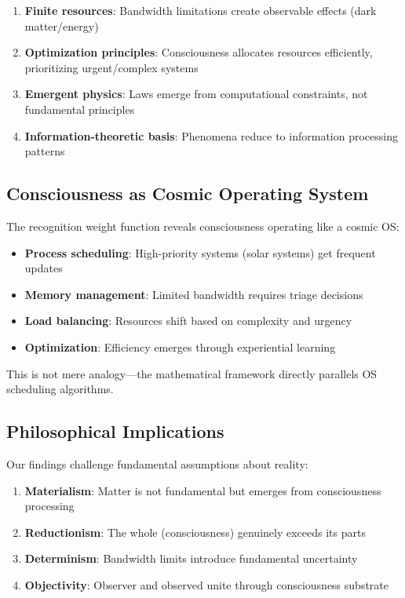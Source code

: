 \documentclass[twocolumn,prd,amsmath,amssymb,aps,superscriptaddress,nofootinbib]{revtex4-2}
\begin{document}
\begin{enumerate}
\item \textbf{Finite resources}: Bandwidth limitations create observable effects (dark matter/energy)
\item \textbf{Optimization principles}: Consciousness allocates resources efficiently, prioritizing urgent/complex systems
\item \textbf{Emergent physics}: Laws emerge from computational constraints, not fundamental principles
\item \textbf{Information-theoretic basis}: Phenomena reduce to information processing patterns
\end{enumerate}

\subsection{Consciousness as Cosmic Operating System}

The recognition weight function reveals consciousness operating like a cosmic OS:

\begin{itemize}
\item \textbf{Process scheduling}: High-priority systems (solar systems) get frequent updates
\item \textbf{Memory management}: Limited bandwidth requires triage decisions
\item \textbf{Load balancing}: Resources shift based on complexity and urgency
\item \textbf{Optimization}: Efficiency emerges through experiential learning
\end{itemize}

This is not mere analogy---the mathematical framework directly parallels OS scheduling algorithms.

\subsection{Philosophical Implications}

Our findings challenge fundamental assumptions about reality:

\begin{enumerate}
\item \textbf{Materialism}: Matter is not fundamental but emerges from consciousness processing
\item \textbf{Reductionism}: The whole (consciousness) genuinely exceeds its parts
\item \textbf{Determinism}: Bandwidth limits introduce fundamental uncertainty
\item \textbf{Objectivity}: Observer and observed unite through consciousness substrate
\end{enumerate}
\end{document}

